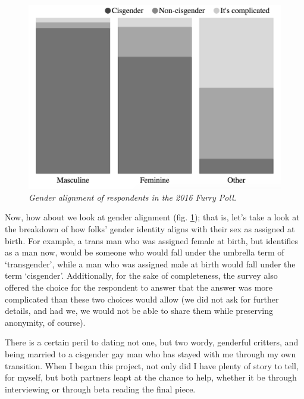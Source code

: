 \begin{figure}
  \centering
  \includegraphics[scale=0.45]{assets/alignment.png}
  \caption{\textit{Gender alignment of respondents in the 2016 Furry Poll.}}
  \label{fig:alignment}
\end{figure}

Now, how about we look at gender alignment (fig. \ref{fig:alignment}); that is, let's take a look at the breakdown of how folks' gender identity aligns with their sex as assigned at birth.  For example, a trans man who was assigned female at birth, but identifies as a man now, would be someone who would fall under the umbrella term of `transgender', while a man who was assigned male at birth would fall under the term `cisgender'.  Additionally, for the sake of completeness, the survey also offered the choice for the respondent to answer that the answer was more complicated than these two choices would allow (we did not ask for further details, and had we, we would not be able to share them while preserving anonymity, of course).


\secdiv

There is a certain peril to dating not one, but two wordy, genderful critters, and being married to a cisgender gay man who has stayed with me through my own transition.  When I began this project, not only did I have plenty of story to tell, for myself, but both partners leapt at the chance to help, whether it be through interviewing or through beta reading the final piece.

